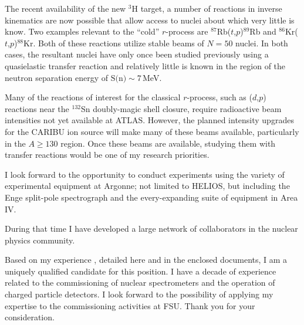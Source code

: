 The recent availability of the new $^3$H target, a number of reactions in inverse kinematics are now possible that %
allow access to nuclei about which very little is know. Two examples relevant to the ``cold'' $r$-process are $^{87}$Rb($t$,$p$)$^{89}$Rb and $^{86}$Kr($t$,$p$)$^{88}$Kr. Both of these reactions utilize stable beams of $N=50$ nuclei. In both cases, the resultant nuclei have 
only once been studied previously using a quasielastic transfer reaction and relatively little is known in the region of the neutron separation energy of $\textrm{S(n)}\sim 7$\,MeV.

Many of the reactions of interest for the classical $r$-process, such as ($d$,$p$) reactions near the $^{132}$Sn doubly-magic shell closure, require radioactive beam intensities not yet available at ATLAS. However, the planned intensity upgrades for the CARIBU ion source will make many of these %
 beams available, particularly in the $A \geq 130$ region. Once these beams are available, studying them with transfer reactions would be one of my research priorities. 



%

{\color{red}I look forward to the opportunity to conduct experiments 
using the variety of experimental equipment at Argonne; not limited to HELIOS, but including the Enge split-pole spectrograph and %
the every-expanding suite of equipment in Area IV.

 During that time I have developed a large network of collaborators in the nuclear physics community. %
}



%
%

\rhead{\desctext{\statename}}
\vspace{1.0\baselineskip}%
Based on my experience%
, detailed here and in the enclosed documents, I am a uniquely qualified candidate for this position.  I have a decade of experience related to the commissioning of nuclear spectrometers and the operation of charged particle detectors. I look forward to the possibility of applying my expertise to the commissioning activities %
at FSU. Thank you for your consideration. 
